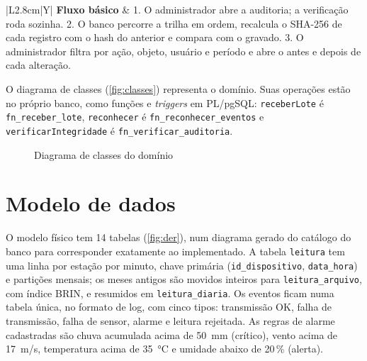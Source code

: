 \begin{quadro}[htb]
  \caption{Caso de uso UC07 -- Auditar e verificar integridade}\label{qua:uc07}
  \footnotesize
  \begin{tabularx}{\textwidth}{|L{2.8cm}|Y|}
    \hline
    \textbf{Fluxo básico} & 1. O administrador abre a auditoria; a verificação roda sozinha. 2. O banco percorre a trilha em ordem, recalcula o SHA-256 de cada registro com o hash do anterior e compara com o gravado. 3. O administrador filtra por ação, objeto, usuário e período e abre o antes e depois de cada alteração. \\ \hline
  \end{tabularx}
\end{quadro}

O diagrama de classes (\autoref{fig:classes}) representa o domínio. Suas operações estão no próprio banco, como funções e \textit{triggers} em PL/pgSQL: \texttt{receberLote} é \texttt{fn\_receber\_lote}, \texttt{reconhecer} é \texttt{fn\_reconhecer\_eventos} e \texttt{verificarIntegridade} é \texttt{fn\_verificar\_auditoria}.

\begin{figure}[htb]
  \caption{Diagrama de classes do domínio}\label{fig:classes}
  \centering
  \resizebox{0.84\textwidth}{!}{}
\end{figure}

\section{Modelo de dados}

O modelo físico tem 14 tabelas (\autoref{fig:der}), num diagrama gerado do catálogo do banco para corresponder exatamente ao implementado. A tabela \texttt{leitura} tem uma linha por estação por minuto, chave primária (\texttt{id\_dispositivo}, \texttt{data\_hora}) e partições mensais; os meses antigos são movidos inteiros para \texttt{leitura\_arquivo}, com índice BRIN, e resumidos em \texttt{leitura\_diaria}. Os eventos ficam numa tabela única, no formato de log, com cinco tipos: transmissão OK, falha de transmissão, falha de sensor, alarme e leitura rejeitada. As regras de alarme cadastradas são chuva acumulada acima de 50~mm (crítico), vento acima de 17~m/s, temperatura acima de 35~°C e umidade abaixo de 20\,\% (alerta).

